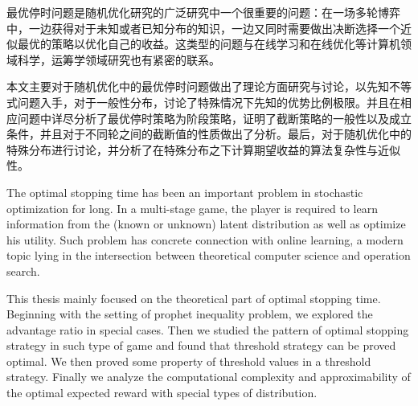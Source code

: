 
 

\makeatletter
\ifthu@bachelor\relax\else
  \ifthu@doctor
  \else
    \ifthu@master
    \fi
  \fi
\fi
\makeatother




\begin{cabstract}

最优停时问题是随机优化研究的广泛研究中一个很重要的问题：在一场多轮博弈中，一边获得对于未知或者已知分布的知识，一边又同时需要做出决断选择一个近似最优的策略以优化自己的收益。这类型的问题与在线学习和在线优化等计算机领域科学，运筹学领域研究也有紧密的联系。

本文主要对于随机优化中的最优停时问题做出了理论方面研究与讨论，以先知不等式问题入手，对于一般性分布，讨论了特殊情况下先知的优势比例极限。并且在相应问题中详尽分析了最优停时策略为阶段策略，证明了截断策略的一般性以及成立条件，并且对于不同轮之间的截断值的性质做出了分析。最后，对于随机优化中的特殊分布进行讨论，并分析了在特殊分布之下计算期望收益的算法复杂性与近似性。

\end{cabstract}


\begin{eabstract}

The optimal stopping time has been an important problem in stochastic optimization for long. In a multi-stage game, the player is required to learn information from the (known or unknown) latent distribution as well as optimize his utility. Such problem has concrete connection with online learning, a modern topic lying in the intersection between theoretical computer science and operation search.


This thesis mainly focused on the theoretical part of optimal stopping time. Beginning with the setting of prophet inequality problem, we explored the advantage ratio in special cases. Then we studied the pattern of optimal stopping strategy in such type of game and found that threshold strategy can be proved optimal. We then proved some property of threshold values in a threshold strategy. Finally we analyze the computational complexity and approximability of the optimal expected reward with special types of distribution.

\end{eabstract}


